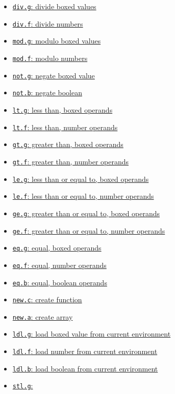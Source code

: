\documentclass[11pt]{article}
\begin{document}
\begin{itemize}
\begin{itemize}
\begin{itemize}
\item \hyperref[sec:org97eb268]{\texttt{div.g}: divide boxed values}
\item \hyperref[sec:org9ea386e]{\texttt{div.f}: divide numbers}
\item \hyperref[sec:org6afbbf6]{\texttt{mod.g}: modulo boxed values}
\item \hyperref[sec:orgf4bf035]{\texttt{mod.f}: modulo numbers}
\item \hyperref[sec:org4404772]{\texttt{not.g}: negate boxed value}
\item \hyperref[sec:org446322c]{\texttt{not.b}: negate boolean}
\item \hyperref[sec:org5479aa3]{\texttt{lt.g}: less than, boxed
operands}
\item \hyperref[sec:orga91f7a6]{\texttt{lt.f}: less than, number
operands}
\item \hyperref[sec:orge89bbc6]{\texttt{gt.g}: greater than, boxed
operands}
\item \hyperref[sec:org3ea3931]{\texttt{gt.f}: greater than,
number operands}
\item \hyperref[sec:orgf9e2550]{\texttt{le.g}: less than
or equal to, boxed operands}
\item \hyperref[sec:orgef83a7a]{\texttt{le.f}: less than
or equal to, number operands}
\item \hyperref[sec:org7e275af]{\texttt{ge.g}: greater
than or equal to, boxed operands}
\item \hyperref[sec:org24757e3]{\texttt{ge.f}: greater
than or equal to, number operands}
\item \hyperref[sec:orgb222de9]{\texttt{eq.g}: equal, boxed operands}
\item \hyperref[sec:orge0a190c]{\texttt{eq.f}: equal, number operands}
\item \hyperref[sec:org73ca0ae]{\texttt{eq.b}: equal, boolean operands}
\item \hyperref[sec:org1d41a06]{\texttt{new.c}: create function}
\item \hyperref[sec:orgcc2c694]{\texttt{new.a}: create array}
\item \hyperref[sec:orgbae78d9]{\texttt{ldl.g}: load
boxed value from current environment}
\item \hyperref[sec:orgb7a98c2]{\texttt{ldl.f}: load
number from current environment}
\item \hyperref[sec:org671ebc7]{\texttt{ldl.b}: load
boolean from current environment}
\item \hyperref[sec:org466d475]{\texttt{stl.g}:
}
\end{itemize}
\end{itemize}
\end{itemize}
\end{document}
